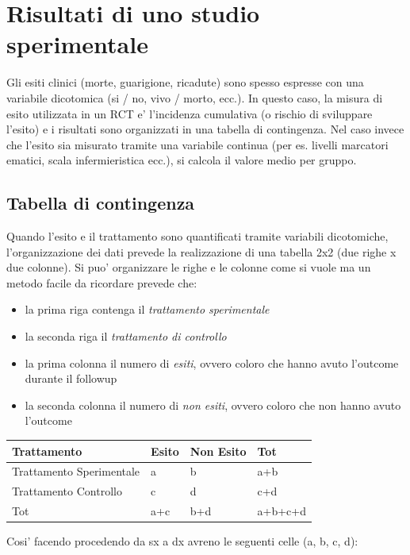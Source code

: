 \documentclass[]{book}
\begin{document}
\hypertarget{risultati-di-uno-studio-sperimentale}{%
\section{Risultati di uno studio sperimentale}\label{risultati-di-uno-studio-sperimentale}}

Gli esiti clinici (morte, guarigione, ricadute) sono spesso espresse con una variabile dicotomica (si / no, vivo / morto, ecc.). In questo caso, la misura di esito utilizzata in un RCT e' l'incidenza cumulativa (o rischio di sviluppare l'esito) e i risultati sono organizzati in una tabella di contingenza. Nel caso invece che l'esito sia misurato tramite una variabile continua (per es. livelli marcatori ematici, scala infermieristica ecc.), si calcola il valore medio per gruppo.

\hypertarget{tabella-di-contingenza}{%
\subsection{Tabella di contingenza}\label{tabella-di-contingenza}}

Quando l'esito e il trattamento sono quantificati tramite variabili dicotomiche, l'organizzazione dei dati prevede la realizzazione di una tabella 2x2 (due righe x due colonne). Si puo' organizzare le righe e le colonne come si vuole ma un metodo facile da ricordare prevede che:

\begin{itemize}
\item
  la prima riga contenga il \emph{trattamento sperimentale}
\item
  la seconda riga il \emph{trattamento di controllo}
\item
  la prima colonna il numero di \emph{esiti}, ovvero coloro che hanno avuto l'outcome durante il followup
\item
  la seconda colonna il numero di \emph{non esiti}, ovvero coloro che non hanno avuto l'outcome
\end{itemize}

\begin{longtable}[]{@{}llll@{}}
\toprule
Trattamento & Esito & Non Esito & Tot\tabularnewline
\midrule
\endhead
Trattamento Sperimentale & a & b & a+b\tabularnewline
Trattamento Controllo & c & d & c+d\tabularnewline
Tot & a+c & b+d & a+b+c+d\tabularnewline
\bottomrule
\end{longtable}

Cosi' facendo procedendo da sx a dx avreno le seguenti celle (a, b, c, d):
\end{document}
